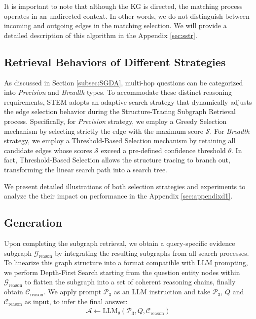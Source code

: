 \documentclass[11pt]{article}
\begin{document}
It is important to note that although the KG is directed, the matching process operates in an undirected context. In other words, we do not distinguish between incoming and outgoing edges in the matching selection. We will provide a detailed description of this algorithm in the Appendix \ref{sec:sstr}.
\subsection{Retrieval Behaviors of Different Strategies}
As discussed in Section \ref{subsec:SGDA}, multi-hop questions can be categorized into \textit{Precision} and \textit{Breadth} types. To accommodate these distinct reasoning requirements, STEM adopts an adaptive search strategy that dynamically adjusts the edge selection behavior during the Structure-Tracing Subgraph Retrieval process. Specifically, for \textit{Precision} strategy, we employ a Greedy Selection mechanism by selecting strictly the edge with the maximum score $\mathcal{S}$. For \textit{Breadth} strategy, we employ a Threshold-Based Selection mechanism by retaining all candidate edges whose scores $\mathcal{S}$ exceed a pre-defined confidence threshold $\theta$. In fact, Threshold-Based Selection allows the structure tracing to branch out, transforming the linear search path into a search tree. 

We present detailed illustrations of both selection strategies and experiments to analyze the their impact on performance in the Appendix \ref{sec:appendixd1}. 

\subsection{Generation}
\label{subsec:generation}
Upon completing the subgraph retrieval, we obtain a query-specific evidence subgraph \( \mathcal{G}_\text{reason} \) by integrating the resulting subgraphs from all search processes. To linearize this graph structure into a format compatible with LLM prompting, we perform Depth-First Search starting from the question entity nodes within \( \mathcal{G}_\text{reason} \) to flatten the subgraph into a set of coherent reasoning chains, finally obtain \( \mathcal{C}_\text{reason} \). We apply prompt \hyperref[fig:p3]{\( \mathcal{P}_3 \)} as an LLM instruction and take \( \mathcal{P}_3 \), \( Q \) and \( \mathcal{C}_\text{reason} \) as input, to infer the final answer:
\begin{align}
\mathcal{A} \leftarrow \text{LLM}_{\theta}(\mathcal{P}_3, Q, \mathcal{C}_\text{reason})
\end{align}
\end{document}
